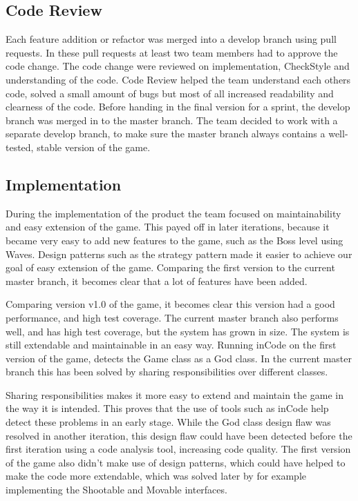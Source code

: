 \documentclass[10pt]{article}
\begin{document}
\subsection*{Code Review}
Each feature addition or refactor was merged into a develop branch using pull requests. In these pull requests at least two team members had to approve the code change. The code change were reviewed on implementation, CheckStyle and understanding of the code. Code Review helped the team understand each others code, solved a small amount of bugs but most of all increased readability and clearness of the code. Before handing in the final version for a sprint, the develop branch was merged in to the master branch. The team decided to work with a separate develop branch, to make sure the master branch always contains a well-tested, stable version of the game.

\subsection*{Implementation}
During the implementation of the product the team focused on maintainability and easy extension of the game. This payed off in later iterations, because it became very easy to add new features to the game, such as the Boss level using Waves. Design patterns such as the strategy pattern made it easier to achieve our goal of easy extension of the game. Comparing the first version to the current master branch, it becomes clear that a lot of features have been added. 

Comparing version v1.0 of the game, it becomes clear this version had a good performance, and high test coverage. The current master branch also performs well, and has high test coverage, but the system has grown in size. The system is still extendable and maintainable in an easy way. Running inCode on the first version of the game, detects the Game class as a God class. In the current master branch this has been solved by sharing responsibilities over different classes. 

Sharing responsibilities makes it more easy to extend and maintain the game in the way it is intended. This proves that the use of tools such as inCode help detect these problems in an early stage. While the God class design flaw was resolved in another iteration, this design flaw could have been detected before the first iteration using a code analysis tool, increasing code quality. The first version of the game also didn't make use of design patterns, which could have helped to make the code more extendable, which was solved later by for example implementing the Shootable and Movable interfaces.
\end{document}
